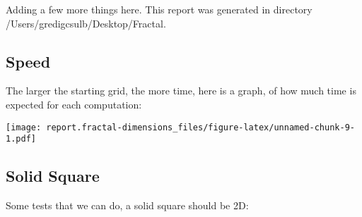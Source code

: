 \documentclass[]{article}
\newenvironment{Shaded}{\begin{snugshade}}{\end{snugshade}}
\newcommand{\DataTypeTok}[1]{\textcolor[rgb]{0.13,0.29,0.53}{#1}}
\newcommand{\DecValTok}[1]{\textcolor[rgb]{0.00,0.00,0.81}{#1}}
\newcommand{\FloatTok}[1]{\textcolor[rgb]{0.00,0.00,0.81}{#1}}
\newcommand{\KeywordTok}[1]{\textcolor[rgb]{0.13,0.29,0.53}{\textbf{#1}}}
\newcommand{\NormalTok}[1]{#1}
\newcommand{\OperatorTok}[1]{\textcolor[rgb]{0.81,0.36,0.00}{\textbf{#1}}}
\newcommand{\StringTok}[1]{\textcolor[rgb]{0.31,0.60,0.02}{#1}}
\begin{document}
Adding a few more things here. This report was generated in directory
/Users/gredigcsulb/Desktop/Fractal.

\hypertarget{speed}{%
\subsection{Speed}\label{speed}}

The larger the starting grid, the more time, here is a graph, of how
much time is expected for each computation:

\begin{Shaded}
\end{Shaded}

\texttt{[image: report.fractal-dimensions\_files/figure-latex/unnamed-chunk-9-1.pdf]}

\hypertarget{solid-square}{%
\subsection{Solid Square}\label{solid-square}}

Some tests that we can do, a solid square should be 2D:
\end{document}
